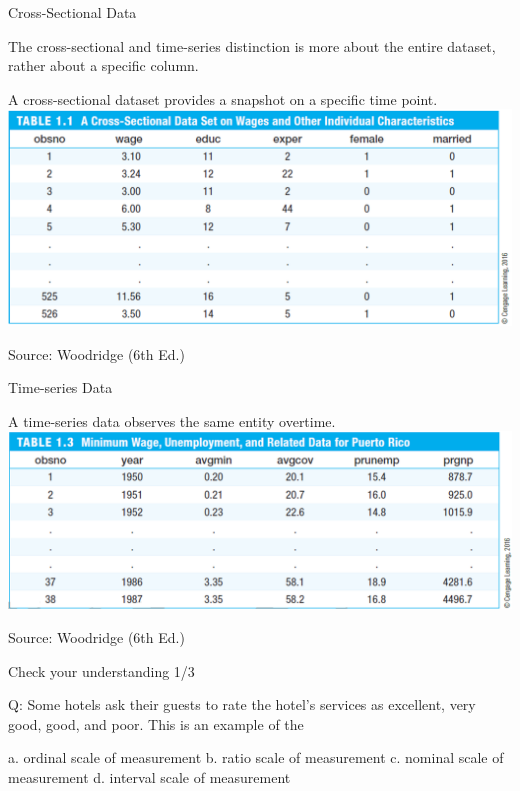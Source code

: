 \documentclass{beamer}
\begin{document}
\begin{frame}{Cross-Sectional Data}

The cross-sectional and time-series distinction is more about the entire dataset, rather about a specific column. 

\begin{center}
A cross-sectional dataset provides a snapshot on a specific time point. 
\includegraphics[scale=0.4]{images/crossSectional.png}
\end{center}
\begin{scriptsize}
Source: Woodridge (6th Ed.)
\end{scriptsize}
\end{frame}


\begin{frame}{Time-series Data}

\begin{center}
A time-series data observes the same entity overtime. 
\includegraphics[scale=0.36]{images/timeSeries.png}
\end{center}
\begin{scriptsize}
Source: Woodridge (6th Ed.)
\end{scriptsize}
\end{frame}



\begin{frame}{Check your understanding 1/3}

Q: Some hotels ask their guests to rate the hotel's services as excellent, very good, good, and poor. This is an example of the

\vspace{5 pt}

a.	ordinal scale of measurement \linebreak
b.	ratio scale of measurement \linebreak
c.	nominal scale of measurement \linebreak
d.	interval scale of measurement


\end{frame}
\end{document}
